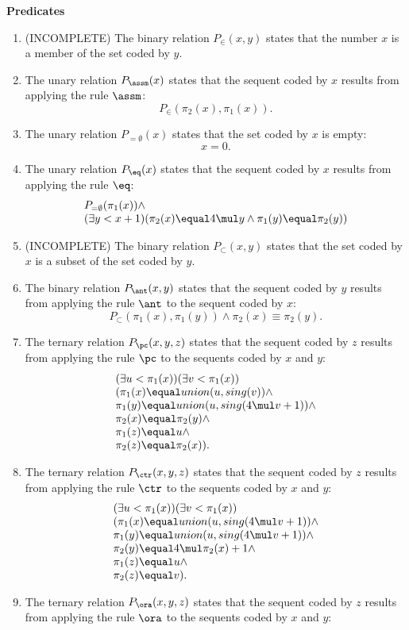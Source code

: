 \textbf{\Large Predicates}
\begin{enumerate}[1.]
%
\item (INCOMPLETE) The binary relation $P_\in(x, y)$ states that the number $x$ is a member of the set coded by $y$.
%
\item The unary relation $P_\assm(x)$ states that the sequent coded by $x$ results from applying the rule $\assm$:
\[
P_\in(\pi_2(x), \pi_1(x)).
\]
%
\item The unary relation $P_{=\emptyset}(x)$ states that the set coded by $x$ is empty:
\[
x \equal 0.
\]
%
\item The unary relation $P_\eq(x)$ states that the sequent coded by $x$ results from applying the rule $\eq$:
\[
\begin{array}{l}
P_{=\emptyset}(\pi_1(x)) \land \cr
(\exists y < x + 1)(\pi_2(x) \equal 4 \mul y \land \pi_1(y) \equal \pi_2(y))
\end{array}
\]
%
\item (INCOMPLETE) The binary relation $P_\subset(x, y)$ states that the set coded by $x$ is a subset of the set coded by $y$.
%
\item The binary relation $P_\ant(x, y)$ states that the sequent coded by $y$ results from applying the rule $\ant$ to the sequent coded by $x$:
\[
P_\subset (\pi_1 (x), \pi_1 (y)) \land \pi_2 (x) \equiv \pi_2 (y).
\]
%
\item The ternary relation $P_\pc(x, y, z)$ states that the sequent coded by $z$ results from applying the rule $\pc$ to the sequents coded by $x$ and $y$:
\[
\begin{array}{l}
(\exists u < \pi_1(x))(\exists v < \pi_1(x)) \cr
(\pi_1(x) \equal union(u, sing(v)) \land \cr
\pi_1(y) \equal union(u, sing(4 \mul v + 1)) \land \cr
\pi_2(x) \equal \pi_2(y) \land \cr
\pi_1(z) \equal u \land \cr
\pi_2(z) \equal \pi_2(x)).
\end{array}
\]
%
\item The ternary relation $P_\ctr(x, y, z)$ states that the sequent coded by $z$ results from applying the rule $\ctr$ to the sequents coded by $x$ and $y$:
\[
\begin{array}{l}
(\exists u < \pi_1(x))(\exists v < \pi_1(x)) \cr
(\pi_1(x) \equal union(u, sing(4 \mul v + 1)) \land \cr
\pi_1(y) \equal union(u, sing(4 \mul v + 1)) \land \cr
\pi_2(y) \equal 4 \mul \pi_2(x) + 1 \land \cr
\pi_1(z) \equal u \land \cr
\pi_2(z) \equal v).
\end{array}
\]
%
\item The ternary relation $P_\ora(x, y, z)$ states that the sequent coded by $z$ results from applying the rule $\ora$ to the sequents coded by $x$ and $y$:

\end{enumerate}

